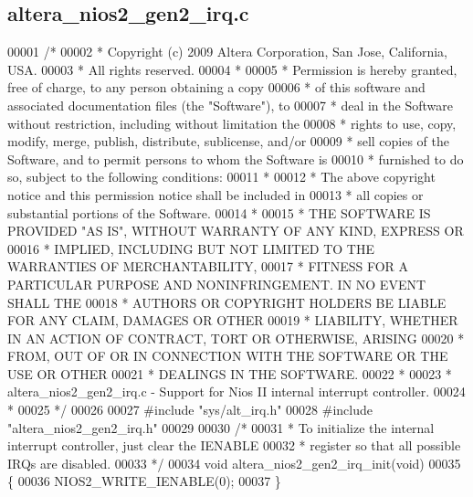 \subsection{altera\+\_\+nios2\+\_\+gen2\+\_\+irq.\+c}
\label{altera__nios2__gen2__irq_8c_source}

\begin{DoxyCode}
00001 \textcolor{comment}{/*}
00002 \textcolor{comment}{ * Copyright (c) 2009 Altera Corporation, San Jose, California, USA.  }
00003 \textcolor{comment}{ * All rights reserved.}
00004 \textcolor{comment}{ * }
00005 \textcolor{comment}{ * Permission is hereby granted, free of charge, to any person obtaining a copy}
00006 \textcolor{comment}{ * of this software and associated documentation files (the "Software"), to }
00007 \textcolor{comment}{ * deal in the Software without restriction, including without limitation the }
00008 \textcolor{comment}{ * rights to use, copy, modify, merge, publish, distribute, sublicense, and/or}
00009 \textcolor{comment}{ * sell copies of the Software, and to permit persons to whom the Software is }
00010 \textcolor{comment}{ * furnished to do so, subject to the following conditions:}
00011 \textcolor{comment}{ *}
00012 \textcolor{comment}{ * The above copyright notice and this permission notice shall be included in }
00013 \textcolor{comment}{ * all copies or substantial portions of the Software.}
00014 \textcolor{comment}{ * }
00015 \textcolor{comment}{ * THE SOFTWARE IS PROVIDED "AS IS", WITHOUT WARRANTY OF ANY KIND, EXPRESS OR }
00016 \textcolor{comment}{ * IMPLIED, INCLUDING BUT NOT LIMITED TO THE WARRANTIES OF MERCHANTABILITY, }
00017 \textcolor{comment}{ * FITNESS FOR A PARTICULAR PURPOSE AND NONINFRINGEMENT. IN NO EVENT SHALL THE}
00018 \textcolor{comment}{ * AUTHORS OR COPYRIGHT HOLDERS BE LIABLE FOR ANY CLAIM, DAMAGES OR OTHER }
00019 \textcolor{comment}{ * LIABILITY, WHETHER IN AN ACTION OF CONTRACT, TORT OR OTHERWISE, ARISING }
00020 \textcolor{comment}{ * FROM, OUT OF OR IN CONNECTION WITH THE SOFTWARE OR THE USE OR OTHER }
00021 \textcolor{comment}{ * DEALINGS IN THE SOFTWARE.}
00022 \textcolor{comment}{ * }
00023 \textcolor{comment}{ * altera\_nios2\_gen2\_irq.c - Support for Nios II internal interrupt controller.}
00024 \textcolor{comment}{ *}
00025 \textcolor{comment}{ */}
00026 
00027 \textcolor{preprocessor}{#include "sys/alt_irq.h"}
00028 \textcolor{preprocessor}{#include "altera_nios2_gen2_irq.h"}
00029 
00030 \textcolor{comment}{/*}
00031 \textcolor{comment}{ * To initialize the internal interrupt controller, just clear the IENABLE}
00032 \textcolor{comment}{ * register so that all possible IRQs are disabled.}
00033 \textcolor{comment}{ */}
00034 \textcolor{keywordtype}{void} altera_nios2_gen2_irq_init(\textcolor{keywordtype}{void}) 
00035 \{
00036     NIOS2_WRITE_IENABLE(0);
00037 \}
\end{DoxyCode}
